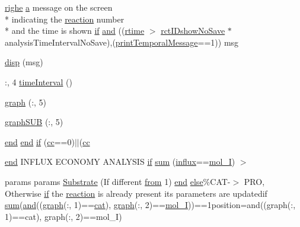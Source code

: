 \begin{DoxyCompactItemize}
\hyperlink{a00108_abdf49e297e2c121f2d09f075ac3d518a}{righe} \hyperlink{a00035_a2ffdbad9ea59541e59cbd2b938e0770c}{a} message on the screen \\*
indicating the \hyperlink{a00028_a4ba2ecb46f808729569ecce2cc1d34c6}{reaction} number \\*
and the time is shown \hyperlink{a00030_a01d55766b8058903dd360b4bda71f9f5}{if} \hyperlink{a00028_a170f8acb213f91bf71c77b1d20bceb33}{and} ((\hyperlink{a00028_afc6b38657a313b9f1de2ee356910b6ee}{rtime} $>$ \hyperlink{a00028_aeb449dcc9eb8bfe0321b031e10962ac5}{rct\-I\-Dshow\-No\-Save} $\ast$analysis\-Time\-Interval\-No\-Save),(\hyperlink{a00028_acc16e80f122cc11cf1570c53597afb19}{print\-Temporal\-Message}==1)) msg
\item 
\hyperlink{a00028_a107ac08fa413d7d0c5323dc4330d83fb}{disp} (msg)
\item 
\-:, 4 \hyperlink{a00028_a430673c9821c17e4bf93cd42f59e00bb}{time\-Interval} ()
\item 
\hyperlink{a00028_a06db733746591db2e7af550e39737769}{graph} (\-:, 5)
\item 
\hyperlink{a00028_a0dcc86024488689bb64656babb50789c}{graph\-S\-U\-B} (\-:, 5)
\item 
\hyperlink{a00025_afb358f48b1646c750fb9da6c6585be2b}{end} \hyperlink{a00025_afb358f48b1646c750fb9da6c6585be2b}{end} \hyperlink{a00028_a69389e83631699e80408490e48a695b0}{if} (\hyperlink{a00028_afb5980388a6e55ca55437b53cdaf528a}{cc}==0)$|$$|$(\hyperlink{a00028_afb5980388a6e55ca55437b53cdaf528a}{cc}
\item 
\hyperlink{a00025_afb358f48b1646c750fb9da6c6585be2b}{end} I\-N\-F\-L\-U\-X E\-C\-O\-N\-O\-M\-Y A\-N\-A\-L\-Y\-S\-I\-S \hyperlink{a00030_a01d55766b8058903dd360b4bda71f9f5}{if} \hyperlink{a00028_a576bebae86b11914280920c448def53d}{sum} (\hyperlink{a00107_a902e747aeec6b345d3a057099152f41f}{influx}==\hyperlink{a00028_ab346189eef5359a07ba32144ddcd4465}{mol\-\_\-\-I}) $>$
\item 
params params \hyperlink{a00028_a933446706261d8afb3d9cb88a769aa2b}{Substrate} (If different \hyperlink{a00028_aa7b4fe13e75a69fca72862effeaf6196}{from} 1) \hyperlink{a00025_afb358f48b1646c750fb9da6c6585be2b}{end} \hyperlink{a00031_af5946383720aa572eb93e1e63afc23c2}{else}\%C\-A\-T-\/$>$ P\-R\-O, Otherwise \hyperlink{a00030_a01d55766b8058903dd360b4bda71f9f5}{if} the \hyperlink{a00028_a4ba2ecb46f808729569ecce2cc1d34c6}{reaction} is already present its parameters are updatedif \hyperlink{a00106_a59a869fb2b28d56dacd91c09e1dffc8d}{sum}(\hyperlink{a00028_a170f8acb213f91bf71c77b1d20bceb33}{and}((\hyperlink{a00028_a2745e24fec2a44d51f4452beb1596bd3}{graph}(\-:, 1)==\hyperlink{a00028_a7073f71a43389f3032e69b1fffc2551a}{cat}), \hyperlink{a00028_a2745e24fec2a44d51f4452beb1596bd3}{graph}(\-:, 2)==\hyperlink{a00028_ab346189eef5359a07ba32144ddcd4465}{mol\-\_\-\-I}))==1position=and((graph(\-:, 1)==cat), graph(\-:, 2)==mol\-\_\-\-I)
$$
\end{DoxyCompactItemize}
